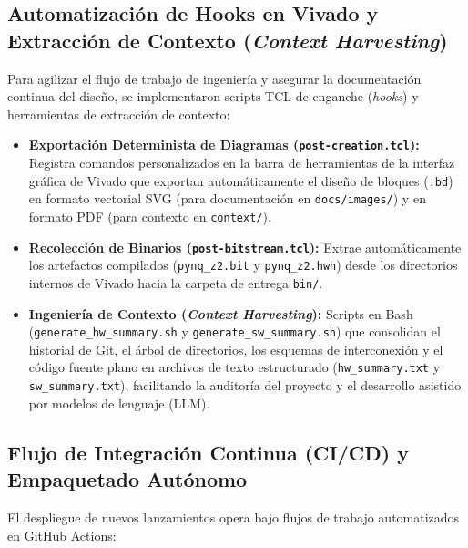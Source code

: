 \documentclass[standalone]{subfiles}
\begin{document}
\subsection{Automatización de Hooks en Vivado y Extracción de Contexto (\textit{Context Harvesting})}
\label{subsec:vivado_hooks_context}

Para agilizar el flujo de trabajo de ingeniería y asegurar la documentación continua del diseño, se implementaron scripts TCL de enganche (\textit{hooks}) y herramientas de extracción de contexto:

\begin{itemize}
    \item \textbf{Exportación Determinista de Diagramas (\texttt{post-creation.tcl}):} Registra comandos personalizados en la barra de herramientas de la interfaz gráfica de Vivado que exportan automáticamente el diseño de bloques (\texttt{.bd}) en formato vectorial SVG (para documentación en \texttt{docs/images/}) y en formato PDF (para contexto en \texttt{context/}).
    
    \item \textbf{Recolección de Binarios (\texttt{post-bitstream.tcl}):} Extrae automáticamente los artefactos compilados (\texttt{pynq\_z2.bit} y \texttt{pynq\_z2.hwh}) desde los directorios internos de Vivado hacia la carpeta de entrega \texttt{bin/}.
    
    \item \textbf{Ingeniería de Contexto (\textit{Context Harvesting}):} Scripts en Bash (\texttt{generate\_hw\_summary.sh} y \texttt{generate\_sw\_summary.sh}) que consolidan el historial de Git, el árbol de directorios, los esquemas de interconexión y el código fuente plano en archivos de texto estructurado (\texttt{hw\_summary.txt} y \texttt{sw\_summary.txt}), facilitando la auditoría del proyecto y el desarrollo asistido por modelos de lenguaje (LLM).
\end{itemize}

\subsection{Flujo de Integración Continua (CI/CD) y Empaquetado Autónomo}
\label{subsec:flujo_cicd_empaquetado}

El despliegue de nuevos lanzamientos opera bajo flujos de trabajo automatizados en GitHub Actions:
\end{document}
